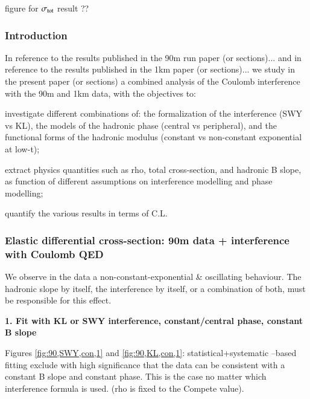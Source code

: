 \> figure for $\sigma_{\rm tot}$ result ??
\fi




\subsubsection{Introduction}

In reference to the results published in the 90m run paper (or sections)... and in reference to the results published in the 1km paper (or sections)... we study in the present paper (or sections) a combined analysis of the Coulomb interference with the 90m and 1km data, with the objectives to:

\> investigate different combinations of: the formalization of the interference (SWY vs
KL), the models of the hadronic phase (central vs peripheral), and the functional
forms of the hadronic modulus (constant vs non-constant exponential at low-t);

\> extract physics quantities such as rho, total cross-section, and hadronic B slope, as
function of different assumptions on interference modelling and phase modelling;

\> quantify the various results in terms of C.L.


\subsubsection{Elastic differential cross-section: 90m data + interference with Coulomb QED}


We observe in the data a non-constant-exponential \& oscillating behaviour.
The hadronic slope by itself, the interference by itself, or a combination of both, must be
responsible for this effect.

{\bf 1. Fit with KL or SWY interference, constant/central phase, constant B slope}

Figures \ref{fig:90,SWY,con,1} and \ref{fig:90,KL,con,1}: statistical+systematic –based fitting exclude with high significance that the data can be
consistent with a constant B slope and constant phase. This is the case no matter which
interference formula is used. (rho is fixed to the Compete value).

